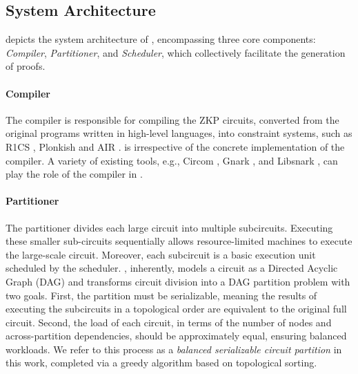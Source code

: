 \subsection{System Architecture}



 depicts the system architecture of \system, encompassing three core components: \emph{Compiler}, \emph{Partitioner}, and \emph{Scheduler}, which collectively facilitate the generation of \zk proofs.


\paragraph{Compiler}  
The compiler is responsible for compiling the ZKP circuits, converted from the original programs written in high-level languages, into constraint systems, such as R1CS \cite{parno2016pinocchio}, Plonkish \cite{gabizon2019plonk} and AIR \cite{ben2019scalable}. \system is irrespective of the concrete implementation of the compiler. A variety of existing tools, e.g., Circom \cite{circom}, Gnark \cite{gnark}, and Libsnark \cite{libsnark},  can play the role of the compiler in \system. 

\paragraph{Partitioner}  
The partitioner divides each large \zk circuit into multiple subcircuits. Executing these smaller sub-circuits sequentially allows resource-limited machines to execute the large-scale circuit. Moreover, each subcircuit is a basic execution unit scheduled by the scheduler. \system, inherently,  models a circuit as a Directed Acyclic Graph (DAG) and transforms circuit division into a DAG partition problem with two goals.  First, the partition must be serializable, meaning the results of executing the subcircuits in a topological order are equivalent to the original full circuit. Second, the load of each circuit, in terms of the number of nodes and across-partition dependencies, should be approximately equal, ensuring balanced workloads. We refer to this process as a \emph{balanced serializable circuit partition} in this work, completed via a greedy algorithm based on topological sorting.



